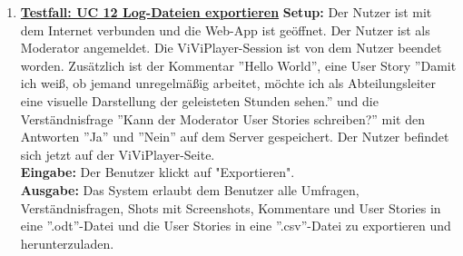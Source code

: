 \begin{enumerate}
	\item \underline{\textbf{Testfall: UC 12 Log-Dateien exportieren}} \linebreak
	\textbf{Setup:} Der Nutzer ist mit dem Internet verbunden und die Web-App ist geöffnet. Der Nutzer ist als Moderator angemeldet. Die ViViPlayer-Session ist von dem Nutzer beendet worden. Zusätzlich ist der Kommentar ''Hello World'', eine User Story ''Damit ich weiß, ob jemand unregelmäßig arbeitet, möchte ich als Abteilungsleiter eine visuelle Darstellung der geleisteten Stunden sehen.'' und die Verständnisfrage ''Kann der Moderator User Stories schreiben?'' mit den Antworten ''Ja'' und ''Nein'' auf dem Server gespeichert. Der Nutzer befindet sich jetzt auf der ViViPlayer-Seite. \\
	\textbf{Eingabe:} Der Benutzer klickt auf "Exportieren". \\
	\textbf{Ausgabe:} Das System erlaubt dem Benutzer alle Umfragen, Verständnisfragen, Shots mit Screenshots, Kommentare und User Stories in eine ''.odt''-Datei und die User Stories in eine ''.csv''-Datei zu exportieren und herunterzuladen.\\ 
	
\end{enumerate}
